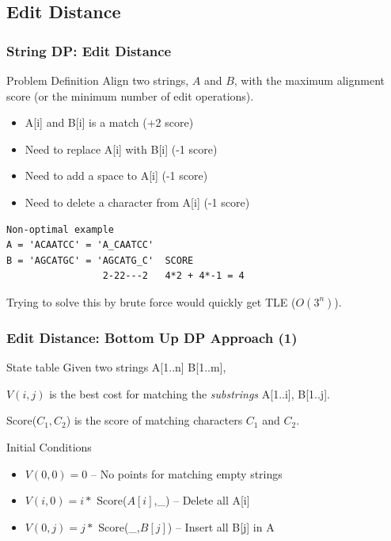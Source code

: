 \documentclass{beamer}
\begin{document}
\subsection{Edit Distance}
\begin{frame}
  \frametitle{String DP: Edit Distance}
  {\smaller
  \begin{block}{Problem Definition}
    Align two strings, $A$ and $B$, with the maximum alignment score
    (or the minimum number of edit operations).

    \begin{itemize}
    \item A[i] and B[i] is a match (+2 score)
    \item Need to replace A[i] with B[i] (-1 score)
    \item Need to add a space to A[i] (-1 score)
    \item Need to delete a character from A[i] (-1 score)
    \end{itemize}
  \end{block}

\begin{verbatim}
Non-optimal example
A = 'ACAATCC' = 'A_CAATCC'
B = 'AGCATGC' = 'AGCATG_C'  SCORE
                 2-22---2   4*2 + 4*-1 = 4
\end{verbatim}

Trying to solve this by brute force would quickly get TLE ($O(3^n)$).

  }
\end{frame}

\begin{frame}
  \frametitle{Edit Distance: Bottom Up DP Approach (1)}
  {\smaller
    \begin{block}{State table}
      Given two strings A[1..n] B[1..m],
      \smallskip

      $V(i,j)$ is the best cost for matching the \emph{substrings} A[1..i], B[1..j].
      \smallskip

      Score($C_1,C_2$) is the score of matching characters $C_1$ and $C_2$.
    \end{block}
    \begin{exampleblock}{Initial Conditions}
      \begin{itemize}
      \item $V(0,0) = 0$ -- No points for matching empty strings
      \item $V(i,0) = i*$ Score($A[i]$,\_) -- Delete all A[i]  
      \item $V(0,j) = j*$ Score(\_,$B[j]$) -- Insert all B[j] in A
      \end{itemize}
    \end{exampleblock}
  }
\end{frame}
\end{document}
